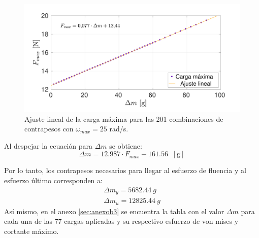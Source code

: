 \begin{figure}[h]
\centering
\includegraphics[width=1\linewidth, trim={1cm 0cm 2cm 0cm}, clip]{Imagenes/fmax_dmec.pdf}
\caption{Ajuste lineal de la carga máxima para las 201 combinaciones de contrapesos con $\omega_{max}=25$ rad/s.}
\label{fig:fmax_dmec}
\end{figure}
Al despejar la ecuación para $\Delta m$ se obtiene:
\begin{equation}
	\Delta m = 12.987\cdot F_{max} - 161.56 \;\; [\text{g}]
\end{equation}

Por lo tanto, los contrapesos necesarios para llegar al esfuerzo de fluencia y al esfuerzo último corresponden a:
\begin{gather*}
	\Delta m_y = 5682.44 \: g \\
	\Delta m_u = 12825.44 \: g
\end{gather*}
Así mismo, en el anexo \ref{sec:anexob3} se encuentra la tabla con el valor $\Delta m$ para cada una de las 77 cargas aplicadas y su respectivo esfuerzo de von mises y cortante máximo.


